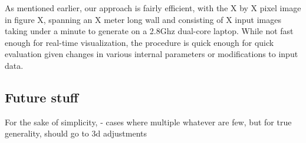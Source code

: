 \documentclass[]{spie}  %
\begin{document}
As mentioned earlier, our approach is fairly efficient, with the X by
X pixel image in figure X, spanning an X meter long wall and
consisting of X input images taking under a minute to generate on a
2.8Ghz dual-core laptop. While not fast enough for real-time
visualization, the procedure is quick enough for quick evaluation given
changes in various internal parameters or modifications to input data.

\subsection{Future stuff}
For the sake of simplicity, - cases where multiple whatever
are few, but for true generality, should go to 3d adjustments


\end{document}
